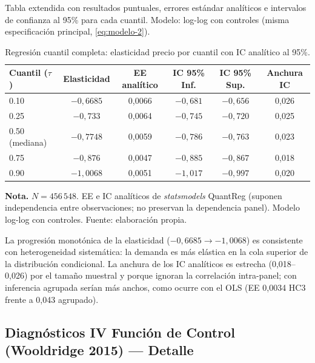 \documentclass[doc, a4paper, biblatex, floatsintext, longtable, babel]{apa7}
\begin{document}
Tabla extendida con resultados puntuales, errores estándar analíticos e intervalos de confianza al 95\% para cada cuantil. Modelo: log-log con controles (misma especificación principal, \cref{eq:modelo-2}).

\begin{table}[!htbp]
\centering
\caption{Regresión cuantil completa: elasticidad precio por cuantil con IC analítico al 95\%.}
\label{tab:appendix_quantile_full}
\footnotesize
\begin{threeparttable}
\begin{tabular}{lccccc}
\toprule
Cuantil ($\tau$) & Elasticidad & EE analítico & IC 95\% Inf. & IC 95\% Sup. & Anchura IC \\
\midrule
0.10 & $-0,6685$ & 0,0066 & $-0,681$ & $-0,656$ & 0,026 \\
0.25 & $-0,733$ & 0,0064 & $-0,745$ & $-0,720$ & 0,025 \\
0.50 (mediana) & $-0,7748$ & 0,0059 & $-0,786$ & $-0,763$ & 0,023 \\
0.75 & $-0,876$ & 0,0047 & $-0,885$ & $-0,867$ & 0,018 \\
0.90 & $-1,0068$ & 0,0051 & $-1,017$ & $-0,997$ & 0,020 \\
\bottomrule
\end{tabular}
\begin{tablenotes}
\footnotesize
\item \textbf{Nota.} $N = 456\,548$. EE e IC analíticos de \textit{statsmodels} QuantReg (suponen independencia entre observaciones; no preservan la dependencia panel). Modelo log-log con controles. Fuente: elaboración propia.
\end{tablenotes}
\end{threeparttable}
\end{table}

La progresión monotónica de la elasticidad ($-0,6685 \rightarrow -1,0068$) es consistente con heterogeneidad sistemática: la demanda es más elástica en la cola superior de la distribución condicional. La anchura de los IC analíticos es estrecha (0,018--0,026) por el tamaño muestral y porque ignoran la correlación intra-panel; con inferencia agrupada serían más anchos, como ocurre con el OLS (EE 0,0034 HC3 frente a 0,043 agrupado).

\subsection{Diagnósticos IV Función de Control (Wooldridge 2015) --- Detalle}
\label{subsec:appendix_iv_cf}
\end{document}
